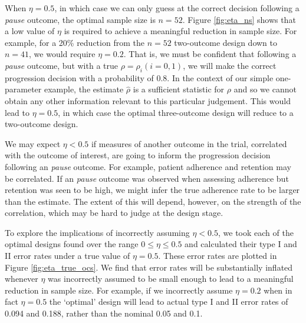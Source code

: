\documentclass{bmcart}
\begin{document}
When $\eta = 0.5$, in which case we can only guess at the correct decision following a \emph{pause} outcome, the optimal sample size is $n = 52$. %
Figure \ref{fig:eta_ns} shows that a low value of $\eta$ is required to achieve a meaningful reduction in sample size. For example, for a 20\% reduction from the $n = 52$ two-outcome design down to $n = 41$, we would require $\eta = 0.2$. That is, we must be confident that following a \emph{pause} outcome, but with a true $\rho = \rho_i (i = 0,1)$, we will make the correct progression decision with a probability of 0.8. In the context of our simple one-parameter example, the estimate $\hat{\rho}$ is a sufficient statistic for $\rho$ and so we cannot obtain any other information relevant to this particular judgement. This would lead to $\eta = 0.5$, in which case the optimal three-outcome design will reduce to a two-outcome design.

We may expect $\eta < 0.5$ if measures of another outcome in the trial, correlated with the outcome of interest, are going to inform the progression decision following an \emph{pause} outcome. For example, patient adherence and retention may be correlated. If an \emph{pause} outcome was observed when assessing adherence but retention was seen to be high, we might infer the true adherence rate to be larger than the estimate. The extent of this will depend, however, on the strength of the correlation, which may be hard to judge at the design stage. 

To explore the implications of incorrectly assuming $\eta < 0.5$, we took each of the optimal designs found over the range $0 \leq \eta \leq 0.5$ and calculated their type I and II error rates under a true value of $\eta = 0.5$. These error rates are plotted in Figure \ref{fig:eta_true_ocs}. We find that error rates will be substantially inflated whenever $\eta$ was incorrectly assumed to be small enough to lead to a meaningful reduction in sample size. For example, if we incorrectly assume $\eta = 0.2$ when in fact $\eta = 0.5$ the `optimal' design will lead to actual type I and II error rates of 0.094 and 0.188, rather than the nominal 0.05 and 0.1.
\end{document}
